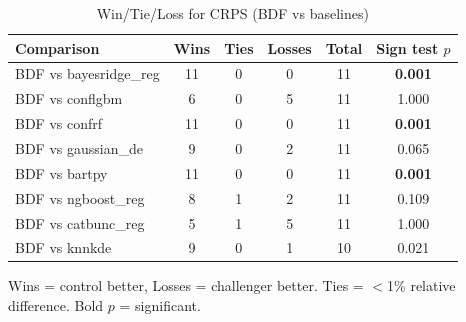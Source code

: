 \begin{table}[htbp]
\centering
\caption{Win/Tie/Loss for CRPS (BDF vs baselines)}
\label{tab:win-tie-loss}
\begin{tabular}{lccccc}
\toprule
Comparison & Wins & Ties & Losses & Total & Sign test $p$ \\
\midrule
BDF vs bayesridge\_reg & 11 & 0 & 0 & 11 & \textbf{0.001} \\
BDF vs conflgbm & 6 & 0 & 5 & 11 & 1.000 \\
BDF vs confrf & 11 & 0 & 0 & 11 & \textbf{0.001} \\
BDF vs gaussian\_de & 9 & 0 & 2 & 11 & 0.065 \\
BDF vs bartpy & 11 & 0 & 0 & 11 & \textbf{0.001} \\
BDF vs ngboost\_reg & 8 & 1 & 2 & 11 & 0.109 \\
BDF vs catbunc\_reg & 5 & 1 & 5 & 11 & 1.000 \\
BDF vs knnkde & 9 & 0 & 1 & 10 & 0.021 \\
\bottomrule
\end{tabular}
\par\smallskip\footnotesize{Wins = control better, Losses = challenger better. Ties = $<$1\% relative difference. Bold $p$ = significant.}
\end{table}
